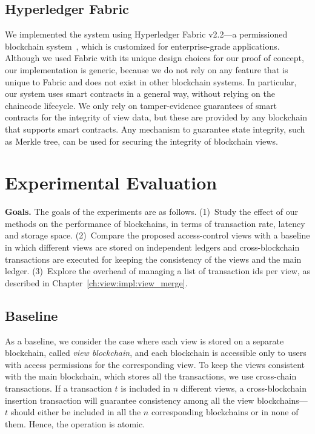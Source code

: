 \subsection{Hyperledger Fabric}
\label{ch:view:impl:fabric}

We implemented the system using Hyperledger Fabric v2.2---a permissioned blockchain system~\cite{androulaki2018hyperledger}, which is customized for enterprise-grade applications. 
Although we used Fabric with its unique design choices for our proof of concept, our implementation is generic, because we do not rely on any feature that is unique to Fabric and does not exist in other blockchain systems. 
In particular, our system uses smart contracts in a general way, 
without relying on the chaincode lifecycle. 
We only rely on tamper-evidence guarantees of smart contracts for the integrity of view data, but these are provided by any blockchain that supports smart contracts. Any mechanism to guarantee state integrity, such as Merkle tree, can be used for securing the integrity of blockchain views.


\section{Experimental Evaluation}
\label{ch:view:experiments}

\smallskip
\noindent
\textbf{Goals.}
The goals of the experiments are as follows. 
(1)~Study the effect of our methods on the performance of blockchains, in terms of transaction rate, latency and storage space.  
(2)~Compare the proposed access-control views with a baseline in which different views are stored on independent ledgers and cross-blockchain transactions are executed for keeping the consistency of the views and the main ledger.
(3)~Explore the overhead of managing a list of transaction ids per view, as described in Chapter~\ref{ch:view:impl:view_merge}. 

\subsection{Baseline}
As a baseline, we consider the case where each view is stored on a separate blockchain, called \textit{view blockchain}, and each blockchain is accessible only to users with access permissions for the corresponding view. 
To keep the views consistent with the main blockchain, which stores all the transactions, we use cross-chain transactions. If a transaction $t$ is included in $n$ different views, a cross-blockchain insertion transaction will guarantee consistency among all the view blockchains---$t$ should either be included in all the $n$ corresponding blockchains or in none of them. Hence, the operation is atomic. 

